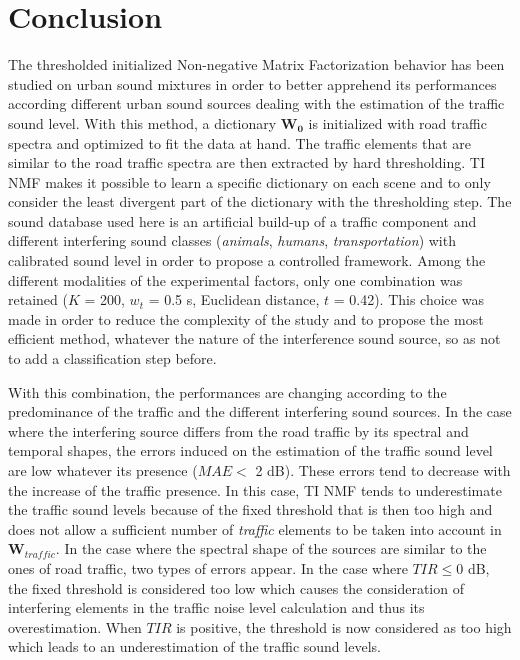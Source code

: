 \documentclass[12pt,english,twoside]{article}
\begin{document}
\section{Conclusion}

The thresholded initialized Non-negative Matrix Factorization behavior has been studied on urban sound mixtures in order to better apprehend its performances according different urban sound sources dealing with the estimation of the traffic sound level.
With this method, a dictionary $\mathbf{W_0}$ is initialized
with road traffic spectra and optimized to fit the data at hand. The traffic
elements that are similar to the road traffic spectra are then extracted by hard thresholding.
TI NMF makes it possible to learn a specific dictionary on each scene and to only consider the least divergent part of the dictionary with the thresholding step.
The sound database used here is an artificial build-up of a traffic component and different interfering sound classes (\textit{animals}, \textit{humans}, \textit{transportation}) with calibrated sound level in order to propose a controlled framework.
Among the different modalities of the experimental factors, only one combination was retained ($K$ = 200, $w_t$ = 0.5 s, Euclidean distance, $t$ = 0.42). This choice was made in order to reduce the complexity of the study and to propose the most efficient method, whatever the nature of the interference sound source, so as not to add a classification step before.

With this combination, the performances are changing according to the predominance of the traffic and the different interfering sound sources. In the case where the interfering source differs from the road traffic by its spectral and temporal shapes, the errors induced on the estimation of the traffic sound level are low whatever its presence ($MAE <$ 2 dB). These errors tend to decrease with the increase of the traffic presence. In this case, TI NMF tends to underestimate the traffic sound levels because of the fixed threshold that is then too high and does not allow a sufficient number of \textit{traffic} elements to be taken into account in $\mathbf{W}_{traffic}$.
In the case where the spectral shape of the sources are similar to the ones of road traffic, two types of errors appear. In the case where $TIR \leq 0$ dB, the fixed threshold is considered too low which causes the consideration of interfering elements in the  traffic noise level calculation and thus its overestimation. When $TIR$ is positive, the threshold is now considered as too high which leads to an underestimation of the traffic sound levels.
\end{document}
